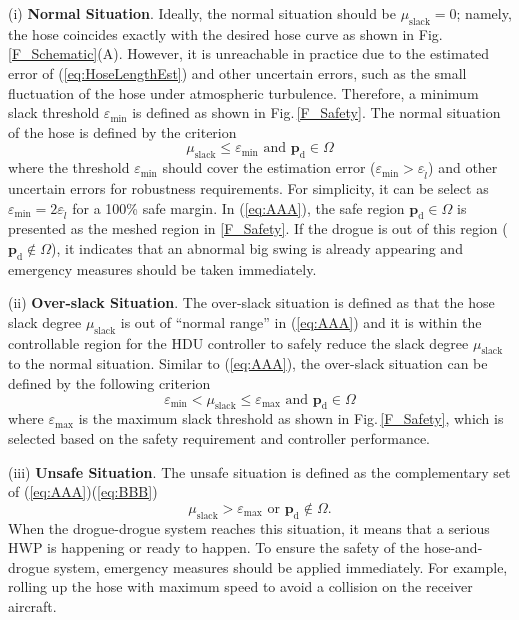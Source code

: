 (i) \textbf{Normal Situation}. Ideally, the normal situation should
be $\mu_\text{slack}=0$; namely, the hose coincides exactly with the desired
hose curve as shown in Fig.\,\ref{F_Schematic}(A). However, it is unreachable
in practice due to the estimated error of (\ref{eq:HoseLengthEst})
and other uncertain errors, such as the small fluctuation of the hose
under atmospheric turbulence. Therefore, a minimum slack threshold
$\varepsilon_{\min}$ is defined as shown in Fig.\,\ref{F_Safety}.
The normal situation of the hose is defined by the criterion
\begin{equation}
\mu_\text{slack}\leq\varepsilon_{\min}\text{ and }\mathbf{p}_{\text{d}}\in\Omega\label{eq:AAA}
\end{equation}
where the threshold $\varepsilon_{\min}$ should cover the estimation
error ($\varepsilon_{\min}>\varepsilon_{\hat{l}}$) and other uncertain
errors for robustness requirements. For simplicity, it can be select
as $\varepsilon_{\min}=2\varepsilon_{\hat{l}}$ for a 100\% safe margin.
In (\ref{eq:AAA}), the safe region $\mathbf{p}_{\text{d}}\in\Omega$ is
presented as the meshed region in \ref{F_Safety}. If the drogue
is out of this region ($\mathbf{p}_{\text{d}}\notin\Omega$), it indicates
that an abnormal big swing is already appearing and emergency measures
should be taken immediately.

(ii) \textbf{Over-slack Situation}. The over-slack situation is defined
as that the hose slack degree $\mu_\text{slack}$ is out of ``normal range''
in (\ref{eq:AAA}) and it is within the controllable region for the
HDU controller to safely reduce the slack degree $\mu_\text{slack}$ to
the normal situation. Similar to (\ref{eq:AAA}), the over-slack situation
can be defined by the following criterion
\begin{equation}
\varepsilon_{\min}<\mu_\text{slack}\leq\varepsilon_{\max}\text{ and }\mathbf{p}_{\text{d}}\in\Omega\label{eq:BBB}
\end{equation}
where $\varepsilon_{\max}$ is the maximum slack threshold as shown
in Fig.\,\ref{F_Safety}, which is selected based on the safety
requirement and controller performance.

(iii) \textbf{Unsafe Situation}. The unsafe situation is defined as
the complementary set of (\ref{eq:AAA})(\ref{eq:BBB})
\begin{equation}
\mu_\text{slack}>\varepsilon_{\max}\text{ or }\mathbf{p}_{\text{d}}\notin\Omega.\label{eq:unsafe}
\end{equation}
When the drogue-drogue system reaches this situation, it means that
a serious HWP is happening or ready to happen. To ensure the safety
of the hose-and-drogue system, emergency measures should be applied
immediately. For example, rolling up the hose with maximum speed to
avoid a collision on the receiver aircraft.

